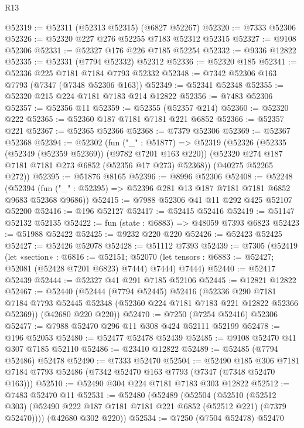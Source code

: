 \begin{lexlean}{R13}
\begin{coremodule}
@52319 := @52311 (@52313 @52315) (@6827 @52267)
@52320 := @7333 @52306
@52326 := @52320 @227 @276 @52255 @7183 @52312 @52315
@52327 := @9108 @52306
@52331 := @52327 @176 @226 @7185 @52254
@52332 := @9336 @12822
@52335 := @52331 (@7794 @52332) @52312
@52336 := @52320 @185
@52341 := @52336 @225 @7181 @7184 @7793 @52332
@52348 := @7342 @52306 @163 @7793 (@7347 (@7348 @52306 @163))
@52349 := @52341 @52348
@52355 := @52320 @215 @224 @7181 @7183 @214 @12822
@52356 := @7483 @52306
@52357 := @52356 @11
@52359 := @52355 (@52357 @214)
@52360 := @52320 @222
@52365 := @52360 @187 @7181 @7181 @221 @6852
@52366 := @52357 @221
@52367 := @52365 @52366
@52368 := @7379 @52306
@52369 := @52367 @52368
@52394 := @52302
    (fun ("_" : @51877) =>
    @52319
      (@52326
        (@52335 (@52349 (@52359 @52369)) (@9782 @7201 @163 @220))
        (@52320 @274 @187 @7181 @7181 @273 @6852 (@52356 @17 @273) @52368))
      (@40275 @52265 @272))
@52395 := @51876 @8165
@52396 := @8996 @52306
@52408 := @52248
    (@52394 (fun ("_" : @52395) => @52396 @281 @13 @187 @7181 @7181 @6852 @9683 @52368 @9686))
@52415 := @7988 @52306 @41 @11 @292 @425 @52107 @52200
@52416 := @196 @52127
@52417 := @52415 @52416
@52419 := @51147 @52132 @52135
@52422 := fun (state : @6883) => @48059 @7393 @6823
@52423 := @51988 @52422
@52425 := @9232 @220 @220
@52426 := @52423 @52425
@52427 := @52426 @52078
@52428 := @51112 @7393
@52439 := @7305
    (@52419
      (let «section» : @6816 := @52151;
      @52070 (let tensors : @6883 := @52427; @52081 (@52428 @7201 @6823) @7444) @7444)
      @7444)
@52440 := @52417 @52439
@52444 := @52327 @41 @291 @7185 @52106
@52445 := @12821 @12822
@52467 := @52440
    (@52444
      (@7794 @52445)
      @52416
      (@52336
        @290
        @7181
        @7184
        @7793
        @52445
        @52348
        (@52360 @224 @7181 @7183 @221 @12822 @52366 @52369))
      (@42680 @220 @220))
@52470 := @7250 (@7254 @52416) @52306
@52477 := @7988 @52470 @296 @11 @308 @424 @52111 @52199
@52478 := @196 @52053
@52480 := @52477 @52478 @52439
@52485 := @9108 @52470 @41 @307 @7185 @52110
@52486 := @23410 @12822
@52489 := @52485 (@7794 @52486) @52478
@52490 := @7333 @52470
@52504 := @52490
    @185
    @306
    @7181
    @7184
    @7793
    @52486
    (@7342 @52470 @163 @7793 (@7347 (@7348 @52470 @163)))
@52510 := @52490 @304 @224 @7181 @7183 @303 @12822
@52512 := @7483 @52470 @11
@52531 := @52480
    (@52489
      (@52504
        (@52510
          (@52512 @303)
          (@52490 @222 @187 @7181 @7181 @221 @6852 (@52512 @221) (@7379 @52470))))
      (@42680 @302 @220))
@52534 := @7250 (@7504 @52478) @52470

\end{coremodule}
\end{lexlean}
